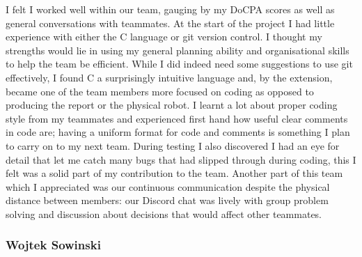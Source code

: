 \documentclass[8pt]{article}
\begin{document}
I felt I worked well within our team, gauging by my DoCPA scores as well as general conversations with teammates. At the start of the project I had little experience with either the C language or git version control. I thought my strengths would lie in using my general planning ability and organisational skills to help the team be efficient. While I did indeed need some suggestions to use git effectively, I found C a surprisingly intuitive language and, by the extension, became one of the team members more focused on coding as opposed to producing the report or the physical robot.
I learnt a lot about proper coding style from my teammates and experienced first hand how useful clear comments in code are; having a uniform format for code and comments is something I plan to carry on to my next team. During testing I also discovered I had an eye for detail that let me catch many bugs that had slipped through during coding, this I felt was a solid part of my contribution to the team.
Another part of this team which I appreciated was our continuous communication despite the physical distance between members: our Discord chat was lively with group problem solving and discussion about decisions that would affect other teammates.

\subsubsection{Wojtek Sowinski} 
\end{document}
